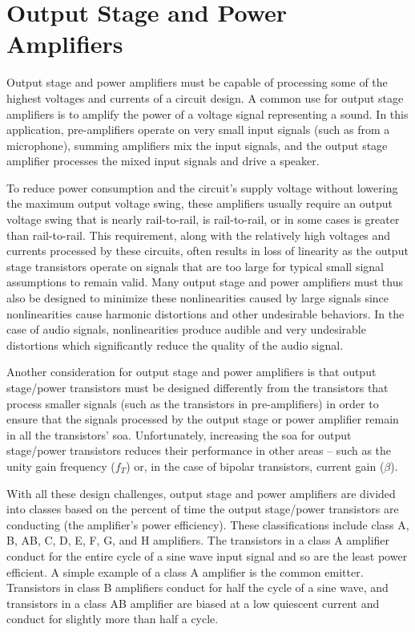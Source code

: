 \chapter{Output Stage and Power Amplifiers}

Output stage and power amplifiers must be capable of processing some of the highest voltages and currents of a circuit design.
A common use for output stage amplifiers is to amplify the power of a voltage signal representing a sound. In this application, pre-amplifiers operate on very small input signals (such as from a microphone), summing amplifiers mix the input signals, and the output stage amplifier processes the mixed input signals and drive a speaker.

To reduce power consumption and the circuit's supply voltage without lowering the maximum output voltage swing, these amplifiers usually require an output voltage swing that is nearly rail-to-rail, is rail-to-rail, or in some cases is greater than rail-to-rail.
This requirement, along with the relatively high voltages and currents processed by these circuits, often results in loss of linearity as the output stage transistors operate on signals that are too large for typical small signal assumptions to remain valid.
Many output stage and power amplifiers must thus also be designed to minimize these nonlinearities caused by large signals since nonlinearities cause harmonic distortions and other undesirable behaviors.
In the case of audio signals, nonlinearities produce audible and very undesirable distortions which significantly reduce the quality of the audio signal.

Another consideration for output stage and power amplifiers is that output stage/power transistors must be designed differently from the transistors that process smaller signals (such as the transistors in pre-amplifiers) in order to ensure that the signals processed by the output stage or power amplifier remain in all the transistors' \ac{soa}.
Unfortunately, increasing the \ac{soa} for output stage/power transistors reduces their performance in other areas -- such as the unity gain frequency ($f_{T}$) or, in the case of bipolar transistors, current gain ($\beta$).

With all these design challenges, output stage and power amplifiers are divided into classes based on the percent of time the output stage/power transistors are conducting (the amplifier's power efficiency).
These classifications include class A, B, AB, C, D, E, F, G, and H amplifiers.
The transistors in a class A amplifier conduct for the entire cycle of a sine wave input signal and so are the least power efficient.
A simple example of a class A amplifier is the common emitter.
Transistors in class B amplifiers conduct for half the cycle of a sine wave, and transistors in a class AB amplifier are biased at a low quiescent current and conduct for slightly more than half a cycle. \autocite[574-575]{microelectronics-neaman}

